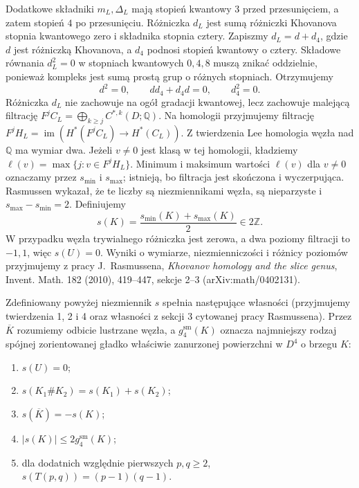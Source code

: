 Dodatkowe składniki $m_L,\Delta_L$ mają stopień
kwantowy $3$ przed przesunięciem, a zatem stopień
$4$ po przesunięciu. Różniczka $d_L$ jest sumą
różniczki Khovanova stopnia kwantowego zero
i składnika stopnia cztery.
Zapiszmy $d_L=d+d_4$, gdzie $d$ jest różniczką
Khovanova, a $d_4$ podnosi stopień kwantowy o cztery.
Składowe równania $d_L^2=0$ w stopniach kwantowych
$0,4,8$ muszą znikać oddzielnie, ponieważ kompleks
jest sumą prostą grup o różnych stopniach. Otrzymujemy
\[
 d^2=0,\qquad dd_4+d_4d=0,\qquad d_4^2=0.
\]
Różniczka $d_L$ nie zachowuje na ogół gradacji kwantowej, lecz
zachowuje malejącą filtrację
$F^j C_L=\bigoplus_{k\ge j} C^{*,k}(D;\mathbb Q)$.
Na homologii przyjmujemy filtrację
$F^j H_L=\operatorname{im}(H^*(F^j C_L)\to H^*(C_L))$.
Z twierdzenia Lee homologia węzła nad $\mathbb Q$
ma wymiar dwa. Jeżeli $v\ne0$ jest klasą w tej
homologii, kładziemy
$\ell(v)=\max\{j:v\in F^j H_L\}$.
Minimum i maksimum wartości $\ell(v)$ dla $v\ne0$
oznaczamy przez $s_{\min}$ i $s_{\max}$; istnieją,
bo filtracja jest skończona i wyczerpująca.
Rasmussen wykazał, że te liczby są niezmiennikami
węzła, są nieparzyste i $s_{\max}-s_{\min}=2$.
Definiujemy
\[
 s(K)=\frac{s_{\min}(K)+s_{\max}(K)}{2}\in2\mathbb Z.
\]
W przypadku węzła trywialnego różniczka jest zerowa,
a dwa poziomy filtracji to $-1,1$, więc $s(U)=0$.
Wyniki o wymiarze, niezmienniczości i różnicy
poziomów przyjmujemy z pracy J.~Rasmussena,
\emph{Khovanov homology and the slice genus},
Invent. Math. 182 (2010), 419--447, sekcje 2--3
(arXiv:math/0402131).

\begin{twierdzenie}[Rasmussen]
Zdefiniowany powyżej niezmiennik $s$ spełnia
następujące własności (przyjmujemy twierdzenia
1, 2 i 4 oraz własności z sekcji 3 cytowanej
pracy Rasmussena). Przez $\overline K$ rozumiemy
odbicie lustrzane węzła, a $g_4^{\mathrm{sm}}(K)$
oznacza najmniejszy rodzaj spójnej zorientowanej
gładko właściwie zanurzonej powierzchni w $D^4$
o brzegu $K$: 
\begin{enumerate}[label=(\roman*)]
\item $s(U)=0$;
\item $s(K_1\#K_2)=s(K_1)+s(K_2)$;
\item $s(\overline K)=-s(K)$;
\item $|s(K)|\leq2g_4^{\mathrm{sm}}(K)$;
\item dla dodatnich względnie pierwszych $p,q\geq2$,
$s(T(p,q))=(p-1)(q-1)$.
\end{enumerate}
\end{twierdzenie}


